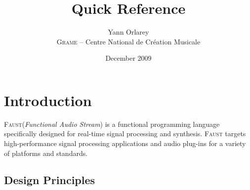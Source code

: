 \documentclass[a4paper]{book}
\begin{document}


\title{\faust Quick Reference}
\author{Yann Orlarey\\\textsc{Grame} -- Centre National de Cr\'eation Musicale}
\date{December 2009}



\newcommand{\farg}[1]{\textrm{\textit{#1}}}
\newcommand{\ldbrack}{[\![ \,}
\newcommand{\rdbrack}{\, ]\!] }
\newcommand{\rdbrackC}{\rdbrack_{\mathrm{C}}\,}
\newcommand{\dbrack}[1]{\ldbrack #1 \rdbrack}
\newcommand{\semantic}[1]{\ldbrack #1 \rdbrack}
\newcommand{\dbrackC}[1]{\ldbrack #1 \rdbrackC}

\newcommand{\faust}{\textsc{Faust}\xspace}
\newcommand{\latex}{\LaTeX\xspace}

\setlength{\parindent}{0pt}
\setlength{\parskip}{1ex plus 0.5ex minus 0.2ex}

\maketitle


\chapter{Introduction}

\faust (\textit{Functional Audio Stream}) is a functional programming language specifically designed for real-time signal processing and synthesis.  \faust targets high-performance signal processing applications and audio plug-ins for a variety of platforms and standards. 

\section{Design Principles}
\end{document}
